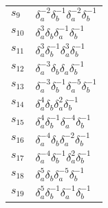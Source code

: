 \documentclass{article}
\begin{document}
\begin{center}
\begin{tabular}{ll}
$s_{9}$ & $\delta_a^{-2}\delta_b^{-1}\delta_a^{-2}\delta_b^{-1}$ \\
$s_{10}$ & $\delta_a^{3}\delta_b^{}\delta_a^{-1}\delta_b^{-1}$ \\
$s_{11}$ & $\delta_a^{3}\delta_b^{-1}\delta_a^{3}\delta_b^{-1}$ \\
$s_{12}$ & $\delta_a^{-3}\delta_b^{}\delta_a^{}\delta_b^{-1}$ \\
$s_{13}$ & $\delta_a^{-3}\delta_b^{-1}\delta_a^{-5}\delta_b^{-1}$ \\
$s_{14}$ & $\delta_a^{4}\delta_b^{}\delta_a^{2}\delta_b^{-1}$ \\
$s_{15}$ & $\delta_a^{4}\delta_b^{-1}\delta_a^{-4}\delta_b^{-1}$ \\
$s_{16}$ & $\delta_a^{-4}\delta_b^{}\delta_a^{-2}\delta_b^{-1}$ \\
$s_{17}$ & $\delta_a^{-4}\delta_b^{-1}\delta_a^{2}\delta_b^{-1}$ \\
$s_{18}$ & $\delta_a^{5}\delta_b^{}\delta_a^{-5}\delta_b^{-1}$ \\
$s_{19}$ & $\delta_a^{5}\delta_b^{-1}\delta_a^{-1}\delta_b^{-1}$ \\
\bottomrule
\end{tabular}
\end{center}

\thispagestyle{empty}
\end{document}
